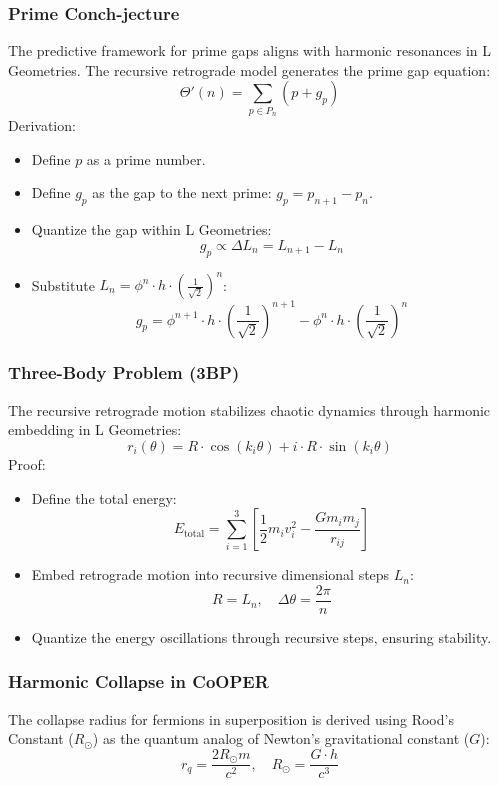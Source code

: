 \documentclass{article}
\begin{document}
\subsubsection*{Prime Conch-jecture}
The predictive framework for prime gaps aligns with harmonic resonances in L Geometries. The recursive retrograde model generates the prime gap equation:
\[
\Theta'(n) = \sum_{p \in P_n} (p + g_p)
\]
Derivation:
\begin{itemize}
    \item Define \(p\) as a prime number.
    \item Define \(g_p\) as the gap to the next prime: \(g_p = p_{n+1} - p_n\).
    \item Quantize the gap within L Geometries:
    \[
    g_p \propto \Delta L_n = L_{n+1} - L_n
    \]
    \item Substitute \(L_n = \phi^n \cdot h \cdot \left(\frac{1}{\sqrt{2}}\right)^n\):
    \[
    g_p = \phi^{n+1} \cdot h \cdot \left(\frac{1}{\sqrt{2}}\right)^{n+1} - \phi^n \cdot h \cdot \left(\frac{1}{\sqrt{2}}\right)^n
    \]
\end{itemize}

\subsubsection*{Three-Body Problem (3BP)}
The recursive retrograde motion stabilizes chaotic dynamics through harmonic embedding in L Geometries:
\[
r_i(\theta) = R \cdot \cos(k_i \theta) + i \cdot R \cdot \sin(k_i \theta)
\]
Proof:
\begin{itemize}
    \item Define the total energy:
    \[
    E_{\text{total}} = \sum_{i=1}^3 \left[ \frac{1}{2} m_i v_i^2 - \frac{G m_i m_j}{r_{ij}} \right]
    \]
    \item Embed retrograde motion into recursive dimensional steps \(L_n\):
    \[
    R = L_n, \quad \Delta \theta = \frac{2 \pi}{n}
    \]
    \item Quantize the energy oscillations through recursive steps, ensuring stability.
\end{itemize}

\subsubsection*{Harmonic Collapse in CoOPER}
The collapse radius for fermions in superposition is derived using Rood’s Constant (\(R_\odot\)) as the quantum analog of Newton’s gravitational constant (\(G\)):
\[
r_q = \frac{2R_\odot m}{c^2}, \quad R_\odot = \frac{G \cdot h}{c^3}
\]
\end{document}

